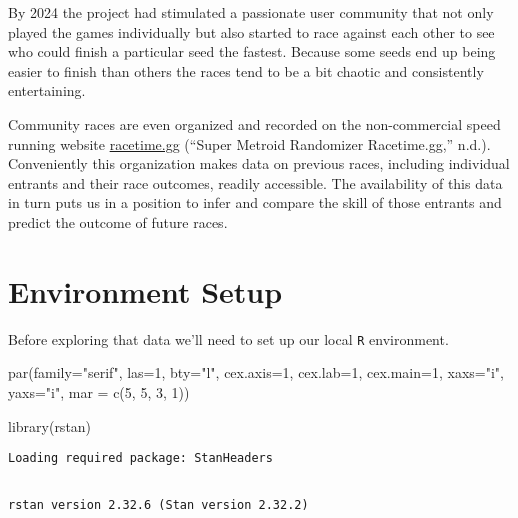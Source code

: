 \documentclass[
  letterpaper,
  DIV=11,
  numbers=noendperiod]{scrartcl}
\newenvironment{Shaded}{\begin{snugshade}}{\end{snugshade}}
\newcommand{\AttributeTok}[1]{\textcolor[rgb]{0.40,0.45,0.13}{#1}}
\newcommand{\DecValTok}[1]{\textcolor[rgb]{0.68,0.00,0.00}{#1}}
\newcommand{\FunctionTok}[1]{\textcolor[rgb]{0.28,0.35,0.67}{#1}}
\newcommand{\NormalTok}[1]{\textcolor[rgb]{0.00,0.23,0.31}{#1}}
\newcommand{\StringTok}[1]{\textcolor[rgb]{0.13,0.47,0.30}{#1}}
\begin{document}
By 2024 the project had stimulated a passionate user community that not
only played the games individually but also started to race against each
other to see who could finish a particular seed the fastest. Because
some seeds end up being easier to finish than others the races tend to
be a bit chaotic and consistently entertaining.

Community races are even organized and recorded on the non-commercial
speed running website \href{https://racetime.gg/smr}{racetime.gg}
({``Super Metroid Randomizer \textbar{} Racetime.gg,''} n.d.).
Conveniently this organization makes data on previous races, including
individual entrants and their race outcomes, readily accessible. The
availability of this data in turn puts us in a position to infer and
compare the skill of those entrants and predict the outcome of future
races.

\section{Environment Setup}\label{environment-setup}

Before exploring that data we'll need to set up our local \texttt{R}
environment.

\begin{Shaded}
\begin{Highlighting}[]
\FunctionTok{par}\NormalTok{(}\AttributeTok{family=}\StringTok{"serif"}\NormalTok{, }\AttributeTok{las=}\DecValTok{1}\NormalTok{, }\AttributeTok{bty=}\StringTok{"l"}\NormalTok{,}
    \AttributeTok{cex.axis=}\DecValTok{1}\NormalTok{, }\AttributeTok{cex.lab=}\DecValTok{1}\NormalTok{, }\AttributeTok{cex.main=}\DecValTok{1}\NormalTok{,}
    \AttributeTok{xaxs=}\StringTok{"i"}\NormalTok{, }\AttributeTok{yaxs=}\StringTok{"i"}\NormalTok{, }\AttributeTok{mar =} \FunctionTok{c}\NormalTok{(}\DecValTok{5}\NormalTok{, }\DecValTok{5}\NormalTok{, }\DecValTok{3}\NormalTok{, }\DecValTok{1}\NormalTok{))}

\FunctionTok{library}\NormalTok{(rstan)}
\end{Highlighting}
\end{Shaded}

\begin{verbatim}
Loading required package: StanHeaders
\end{verbatim}

\begin{verbatim}

rstan version 2.32.6 (Stan version 2.32.2)
\end{verbatim}
\end{document}
